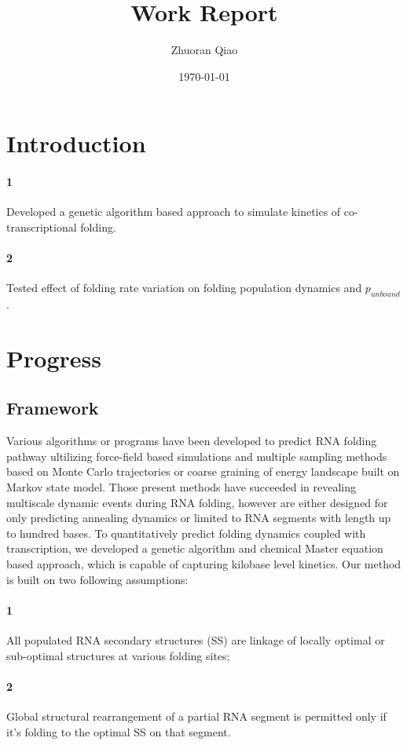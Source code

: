 \documentclass[11pt, a4paper]{article}
\begin{document}
\title{Work Report}
\author{Zhuoran Qiao}
\date{\today}

\maketitle

\section{Introduction}

\paragraph{1} Developed a genetic algorithm based approach to simulate kinetics of co-transcriptional folding.
\paragraph{2} Tested effect of folding rate variation on folding population dynamics and $p_{unbound}$.


\section{Progress}
\subsection{Framework}
Various algorithms or programs have been developed to predict RNA folding pathway ultilizing force-field based simulations\cite{RaviprasadAduri2007} and multiple sampling methods based on Monte Carlo trajectories\cite{Gultyaev1995}\cite{Clote} or coarse graining of energy landscape built on Markov state model\cite{Wolfinger}\cite{Sun2018}. Those present methods have succeeded in revealing multiscale dynamic events during RNA folding, however are either designed for only predicting
annealing dynamics or limited to RNA segments with length up to hundred bases. To quantitatively predict folding dynamics coupled with transcription,
we developed a genetic algorithm and chemical Master equation based approach, which is capable of capturing kilobase level kinetics.
 Our method is built on two following assumptions:
\paragraph{1} All populated RNA secondary structures (SS) are linkage of locally optimal or sub-optimal structures at various folding sites;
\paragraph{2} Global structural rearrangement of a partial RNA segment is permitted only if it's folding to the optimal SS on that segment.
\\
\end{document}
